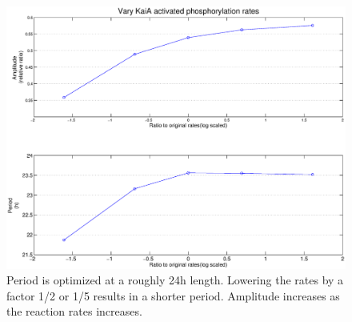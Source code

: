 \documentclass[a4paper,10pt]{article}
\numberwithin{equation}{section}
\begin{document}
\begin{figure}[H]
\centering
\includegraphics[scale=0.4]{tempcomp8.eps}
\caption{\selectfont Period is optimized at a roughly 24h length. Lowering the rates by a factor 1/2 or 1/5 results in a shorter period. Amplitude increases as the reaction rates increases.}\label{fig:tempcomp8}
\end{figure}

\end{document}
